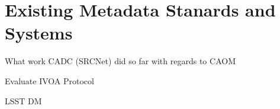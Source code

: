 \section{Existing Metadata Stanards and Systems}\label{sec:exist_mod}

What work CADC (SRCNet) did so far with regards to CAOM

Evaluate IVOA Protocol 

LSST DM